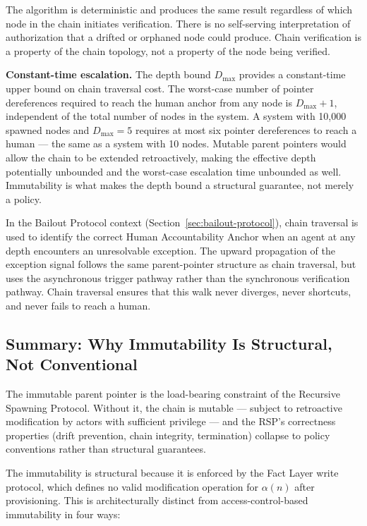 The algorithm is deterministic and produces the same result regardless of which node in the chain initiates verification. There is no self-serving interpretation of authorization that a drifted or orphaned node could produce. Chain verification is a property of the chain topology, not a property of the node being verified.

\medskip
\noindent\textbf{Constant-time escalation.} The depth bound $D_{\max}$ provides a constant-time upper bound on chain traversal cost. The worst-case number of pointer dereferences required to reach the human anchor from any node is $D_{\max} + 1$, independent of the total number of nodes in the system. A system with 10,000 spawned nodes and $D_{\max} = 5$ requires at most six pointer dereferences to reach a human --- the same as a system with 10 nodes. Mutable parent pointers would allow the chain to be extended retroactively, making the effective depth potentially unbounded and the worst-case escalation time unbounded as well. Immutability is what makes the depth bound a structural guarantee, not merely a policy.

In the Bailout Protocol context (Section~\ref{sec:bailout-protocol}), chain traversal is used to identify the correct Human Accountability Anchor when an agent at any depth encounters an unresolvable exception. The upward propagation of the exception signal follows the same parent-pointer structure as chain traversal, but uses the asynchronous trigger pathway rather than the synchronous verification pathway. Chain traversal ensures that this walk never diverges, never shortcuts, and never fails to reach a human.

\subsection{Summary: Why Immutability Is Structural, Not Conventional}
\label{sec:immutability-structural-summary}

The immutable parent pointer is the load-bearing constraint of the Recursive Spawning Protocol. Without it, the chain is mutable --- subject to retroactive modification by actors with sufficient privilege --- and the RSP's correctness properties (drift prevention, chain integrity, termination) collapse to policy conventions rather than structural guarantees.

The immutability is structural because it is enforced by the Fact Layer write protocol, which defines no valid modification operation for $\alpha(n)$ after provisioning. This is architecturally distinct from access-control-based immutability in four ways:


